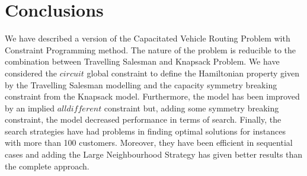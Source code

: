 \chapter{Conclusions}
We have described a version of the Capacitated Vehicle Routing Problem with Constraint Programming method. The nature of the problem is reducible to the combination between Travelling Salesman and Knapsack Problem. We have considered the \begin{math} circuit \end{math} global constraint to define the Hamiltonian property given by the Travelling Salesman modelling and the capacity symmetry breaking constraint from the Knapsack model. Furthermore, the model has been improved by an implied \begin{math}alldifferent\end{math} constraint but, adding some symmetry breaking constraint, the model decreased performance in terms of search. Finally, the search strategies have had problems in finding optimal solutions for instances with more than 100 customers. Moreover, they have been efficient in sequential cases and adding the Large Neighbourhood Strategy has given better results than the complete approach. 


